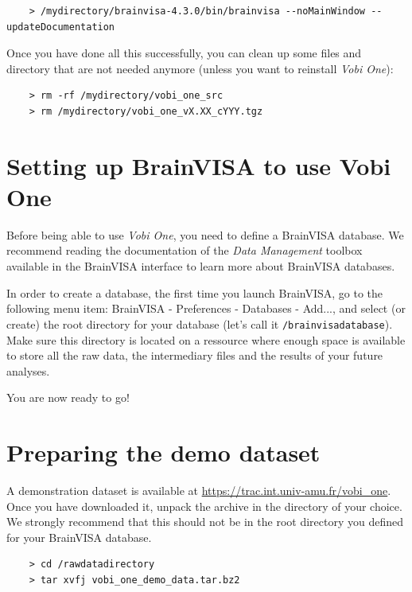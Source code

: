 \begin{verbatim}
    > /mydirectory/brainvisa-4.3.0/bin/brainvisa --noMainWindow --updateDocumentation
\end{verbatim}

Once you have done all this successfully, you can clean up some files and directory that are not needed anymore (unless you want to reinstall {\em Vobi One}):

\begin{verbatim}
    > rm -rf /mydirectory/vobi_one_src
    > rm /mydirectory/vobi_one_vX.XX_cYYY.tgz
\end{verbatim}



\section{Setting up BrainVISA to use Vobi One}
Before being able to use {\em Vobi One}, you need to define a BrainVISA database. We recommend reading the documentation of the {\em Data Management} toolbox available in the BrainVISA interface to learn more about BrainVISA databases.

In order to create a database, the first time you launch BrainVISA, go to the following menu item: 
BrainVISA - Preferences - Databases - Add...,  and select (or create) the root directory for your database (let's call it \texttt{/brainvisadatabase}).
Make sure this directory is located on a ressource where enough space is available to store all the raw data, the intermediary
files and the results of your future analyses.

You are now ready to go!

\section{Preparing the demo dataset}

A demonstration dataset is available at \url{https://trac.int.univ-amu.fr/vobi_one}. Once you have downloaded it, unpack the archive in the directory of your choice. We strongly recommend that this should not be in the root directory you defined for your BrainVISA database.

\begin{verbatim}
    > cd /rawdatadirectory
    > tar xvfj vobi_one_demo_data.tar.bz2
\end{verbatim}
